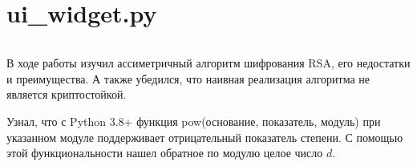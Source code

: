 \documentclass[utf8x, 14pt, bold, times]{G7-32} %
\begin{document}
\section{ui\_widget.py}

\inputminted[fontsize=\footnotesize, breaklines]{python}{../../src/ui_widget.py}

\iffalse
Анализ граф-схемы микропрограммы (ГСМ) показал, что дополнительных пустых
операторных вершин вводить не требуется. ГСМ, размеченная для автомата Мили,
приведена на рисунке~\ref{ris:marked-graph-scheme}.

\vspace{\baselineskip}
\begin{figure}[H]
\center{\texttt{[image: figures/marked-graph-scheme.png]}}
    \caption{Граф-схема микропрограммы, размеченная для автомата Мили}
\label{ris:marked-graph-scheme}
\end{figure}
\fi


\backmatter %

\newpage
\Conclusion

В ходе работы изучил ассиметричный алгоритм шифрования RSA, его недостатки и преимущества.
А также убедился, что наивная реализация алгоритма не является криптостойкой.

Узнал, что с Python 3.8+ функция pow(основание, показатель, модуль) при указанном модуле
поддерживает отрицательный показатель степени\cite{python-pow}.
С помощью этой функциональности нашел обратное по модулю целое число $d$.

\newpage
\nocite{*}


\end{document}
